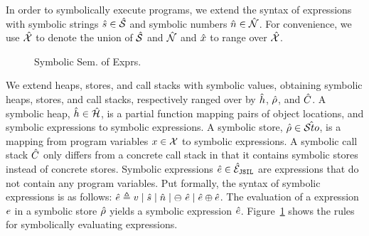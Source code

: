In order to symbolically execute \jsil programs, we extend the syntax of \jsil expressions with 
symbolic strings $\hat{s} \in \hat{\mathcal{S}}$ and symbolic numbers $\hat{n} \in \hat{\mathcal{N}}$. 
For convenience, we use $\hat{\mathcal{X}}$ to denote the union of $\hat{\mathcal{S}}$ and $\hat{\mathcal{N}}$ 
and $\hat{x}$ to range over $\hat{\mathcal{X}}$. 


\begin{figure}
\vspace*{-1.2cm}
{\scriptsize
{}}
{\small \vspace{-0.2cm}\caption{Symbolic Sem. of Exprs.}\label{fig:symb:sem:exprs}}
\vspace*{-0.7cm}
\end{figure}

We extend heaps, stores, and call stacks with symbolic values, obtaining symbolic 
heaps, stores, and call stacks, respectively ranged over by $\hat{h}$, $\hat\rho$, and $\hat{C}$. 
A symbolic heap, $\hat{h} \in \hat{\mathcal H}$, is a partial function mapping pairs of  
object locations, and symbolic expressions to symbolic expressions. 
A symbolic store, $\hat\rho \in \hat{{\mathcal S}to}$, is a mapping from program variables 
$x \in \mathcal{X}$ to symbolic expressions.
A symbolic call stack $\hat{C}$ only differs from a concrete call stack in that it contains 
symbolic stores instead of concrete stores.
%
Symbolic expressions $\hat{e} \in \hat{\mathcal{E}}_{\mathtt{JSIL}}$ are \jsil expressions that do not contain 
any program variables. Put formally, the syntax of symbolic expressions is as follows: 
$\hat{e} \triangleq v \mid \hat{s} \mid \hat{n} \mid \ominus\ \hat{e} \mid \hat{e} \oplus \hat{e}$.
The evaluation of a \jsil expression $e$ in a symbolic store $\hat\rho$ yields a 
symbolic expression $\hat{e}$.
Figure~\ref{fig:symb:sem:exprs} shows the rules for symbolically evaluating \jsil expressions. 

